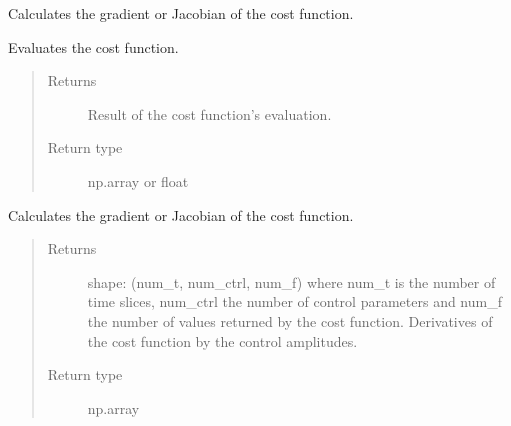 \documentclass[letterpaper,10pt,english]{sphinxmanual}
\begin{document}
\begin{fulllineitems}
\begin{fulllineitems}
\end{fulllineitems}


\begin{fulllineitems}
\label{\detokenize{qsim:qsim.cost_functions.CostFunction.grad}}
Calculates the gradient or Jacobian of the cost function.

\end{fulllineitems}


\begin{fulllineitems}
\label{\detokenize{qsim:id0}}
Evaluates the cost function.
\begin{quote}\begin{description}
\item[{Returns}] \leavevmode
{} \textendash{} Result of the cost function’s evaluation.

\item[{Return type}] \leavevmode
np.array or float

\end{description}\end{quote}

\end{fulllineitems}


\begin{fulllineitems}
\label{\detokenize{qsim:id6}}
Calculates the gradient or Jacobian of the cost function.
\begin{quote}\begin{description}
\item[{Returns}] \leavevmode
{} \textendash{} shape: (num\_t, num\_ctrl, num\_f) where num\_t is the number of time
slices, num\_ctrl the number of control parameters and num\_f the
number of values returned by the cost function. Derivatives of
the cost function by the control amplitudes.

\item[{Return type}] \leavevmode
np.array

\end{description}\end{quote}

\end{fulllineitems}


\end{fulllineitems}
\end{document}
